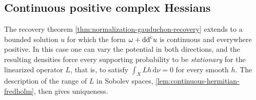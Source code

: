 \subsection{Continuous positive complex Hessians}
\label{subsec:continuous-hessian-adjoints}

The recovery theorem \cref{thm:normalization-gauduchon-recovery} extends
to a bounded solution $u$ for which the form $\omega+\mathrm{dd}^{\mathrm{c}} u$ is continuous
and everywhere positive. In this case one can vary the potential in both
directions, and the resulting densities force every supporting probability
to be \emph{stationary} for the linearized operator $L$, that is, to satisfy
$\int_XLh\,\mathrm d\nu=0$ for every smooth $h$. The description of the range
of $L$ in Sobolev spaces, \cref{lem:continuous-hermitian-fredholm}, then
gives uniqueness.

